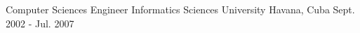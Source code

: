 


\begin{cventries}


\cventry
{Computer Sciences Engineer} %
{Informatics Sciences University} %
{Havana, Cuba} %
{Sept. 2002 - Jul. 2007} %
{ %
}


\end{cventries}
